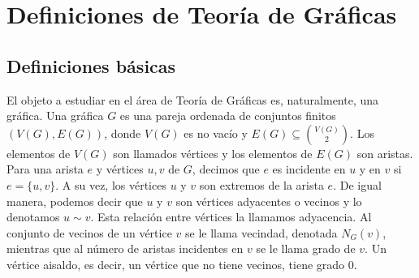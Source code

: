 \chapter{Definiciones de Teor\'ia de Gr\'aficas}%
\label{cap:defs grafs}

\section{Definiciones b\'asicas}%
\label{sec:def-basicas}

El objeto a estudiar en el \'area de Teor\'ia de Gr\'aficas es, naturalmente,
una gr\'afica. Una gr\'afica $G$ es una pareja ordenada de conjuntos finitos
$(V(G), E(G))$, donde $V(G)$ es no vac\'io y $E(G) \subseteq \binom{V(G)}{2}$.
Los elementos de $V(G)$ son llamados v\'ertices y los elementos de $E(G)$ son
aristas. Para una arista $e$ y v\'ertices $u, v$ de $G$, decimos que $e$ es
incidente en $u$ y en $v$ si $e= \{u, v\}$. A su vez, los v\'ertices $u$ y $v$
son extremos de la arista $e$. De igual manera, podemos decir que $u$ y $v$ son
v\'ertices adyacentes o vecinos y lo denotamos $u \sim v$. Esta relaci\'on entre
v\'ertices la llamamos adyacencia. Al conjunto de vecinos de un v\'ertice $v$ se
le llama vecindad, denotada $N_G(v)$, mientras que al n\'umero de aristas
incidentes en $v$ se le llama grado de $v$. Un v\'ertice aisaldo, es decir, un
v\'ertice que no tiene vecinos, tiene grado $0$.

